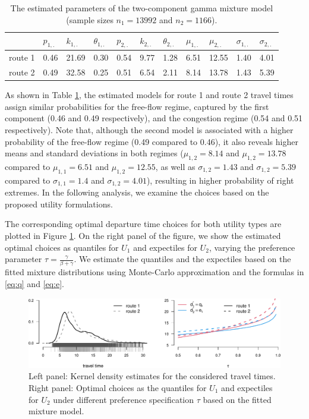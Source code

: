 \documentclass[preprint, 3p, authoryear]{elsarticle} %
\theoremstyle{definition}
\theoremstyle{definition}
\theoremstyle{definition}
\theoremstyle{definition}
\theoremstyle{remark}
\begin{document}
\begin{table}

\caption{\label{tab:tabpars}The estimated parameters of the two-component gamma mixture model (sample sizes $n_{1}=13992$ and $n_{2}=1166$).}
\centering
\begin{tabular}[t]{l|l|l|l|l|l|l|l|l|l|l}
\hline
  & $p_{1,.}$ & $k_{1,.}$ & $\theta_{1,.}$ & $p_{2,.}$ & $k_{2,.}$ & $\theta_{2,.}$ & $\mu_{1,.}$ & $\mu_{2,.}$ & $\sigma_{1,.}$ & $\sigma_{2,.}$\\
\hline
route 1 & 0.46 & 21.69 & 0.30 & 0.54 & 9.77 & 1.28 & 6.51 & 12.55 & 1.40 & 4.01\\
\hline
route 2 & 0.49 & 32.58 & 0.25 & 0.51 & 6.54 & 2.11 & 8.14 & 13.78 & 1.43 & 5.39\\
\hline
\end{tabular}
\end{table}

As shown in Table \ref{tab:tabpars}, the estimated models for route 1 and route 2 travel times assign similar probabilities for the free-flow regime, captured by the first component (0.46 and 0.49 respectively), and the congestion regime (0.54 and 0.51 respectively). Note that, although the second model is associated with a higher probability of the free-flow regime (0.49 compared to 0.46), it also reveals higher means and standard deviations in both regimes (\(\mu_{1,2}=8.14\) and \(\mu_{1,2}=13.78\) compared to \(\mu_{1,1}=6.51\) and \(\mu_{1,2}=12.55\), as well as \(\sigma_{1,2}=1.43\) and \(\sigma_{1,2}=5.39\) compared to \(\sigma_{1,1}=1.4\) and \(\sigma_{1,2}=4.01\)), resulting in higher probability of right extremes. In the following analysis, we examine the choices based on the proposed utility formulations.

The corresponding optimal departure time choices for both utility types are plotted in Figure \ref{fig:choices}. On the right panel of the figure, we show the estimated optimal choices as quantiles for \(U_1\) and expectiles for \(U_2\), varying the preference parameter \(\tau=\frac{\gamma}{\beta+\gamma}\). We estimate the quantiles and the expectiles based on the fitted mixture distributions using Monte-Carlo approximation and the formulas in \eqref{eq:q} and \eqref{eq:e}.

\begin{figure}
\includegraphics[width=1\linewidth]{traffic-expectiles_files/figure-latex/choices-1} \caption{Left panel: Kernel density estimates for the considered travel times. Right panel: Optimal choices as the quantiles for $U_1$ and expectiles for $U_2$  under different preference specification $\tau$ based on the fitted mixture model.}\label{fig:choices}
\end{figure}
\end{document}
